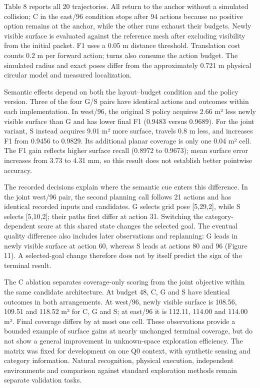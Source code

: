 \documentclass[11pt,a4paper]{article}
\begin{document}
Table 8 reports all 20 trajectories. All return to the anchor without a
simulated collision; C in the east/96 condition stops after 94 actions
because no positive option remains at the anchor, while the other runs
exhaust their budgets. Newly visible surface is evaluated against the
reference mesh after excluding visibility from the initial packet. F1
uses a 0.05 m distance threshold. Translation cost counts 0.2 m per
forward action; turns also consume the action budget. The simulated
radius and exact poses differ from the approximately 0.721 m physical
circular model and measured localization.



Semantic effects depend on both the layout--budget condition and the
policy version. Three of the four G/S pairs have identical actions and
outcomes within each implementation. In west/96, the original S policy
acquires 2.66 m² less newly visible surface than G and has lower final
F1 (0.9483 versus 0.9689). For the joint variant, S instead acquires
9.01 m² more surface, travels 0.8 m less, and increases F1 from 0.9456
to 0.9829. Its additional planar coverage is only one 0.04 m² cell. The
F1 gain reflects higher surface recall (0.8972 to 0.9673); mean surface
error increases from 3.73 to 4.31 mm, so this result does not establish
better pointwise accuracy.


The recorded decisions explain where the semantic cue enters this
difference. In the joint west/96 pair, the second planning call follows
21 actions and has identical recorded inputs and candidates. G selects
grid pose {[}5,29,2{]}, while S selects {[}5,10,2{]}; their paths first
differ at action 31. Switching the category-dependent score at this
shared state changes the selected goal. The eventual quality difference
also includes later observations and replanning: G leads in newly
visible surface at action 60, whereas S leads at actions 80 and 96
(Figure 11). A selected-goal change therefore does not by itself predict
the sign of the terminal result.


The C ablation separates coverage-only scoring from the joint objective
within the same candidate architecture. At budget 48, C, G and S have
identical outcomes in both arrangements. At west/96, newly visible
surface is 108.56, 109.51 and 118.52 m² for C, G and S; at east/96 it is
112.11, 114.00 and 114.00 m². Final coverage differs by at most one
cell. These observations provide a bounded example of surface gains at
nearly unchanged terminal coverage, but do not show a general
improvement in unknown-space exploration efficiency. The matrix was
fixed for development on one Q0 context, with synthetic sensing and
category information. Natural recognition, physical execution,
independent environments and comparison against standard exploration
methods remain separate validation tasks.
\end{document}
